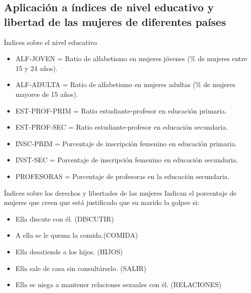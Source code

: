 \documentclass{beamer}
\begin{document}
\subsection{Aplicación a índices de nivel educativo y libertad de las mujeres de diferentes países}
\begin{frame}{Índices sobre el nivel educativo}
\begin{footnotesize}
\begin{itemize}
    \item ALF-JOVEN = Ratio de alfabetismo en mujeres jóvenes (\% de mujeres entre 15 y 24 años).
    \item ALF-ADULTA = Ratio de alfabetismo en mujeres adultas (\% de mujeres mayores de 15 años).
    \item EST-PROF-PRIM = Ratio estudiante-profesor en educación primaria.
    \item EST-PROF-SEC = Ratio estudiante-profesor en educación secundaria.
    \item INSC-PRIM = Porcentaje de inscripción femenino en educación primaria.
    \item INST-SEC = Porcentaje de inscripción femenino en educación secundaria.
    \item PROFESORAS = Porcentaje de profesoras en la educación secundaria.
\end{itemize}
\end{footnotesize}
\end{frame}

\begin{frame}{Índices sobre los derechos y libertades de las mujeres}
Indican el porcentaje de mujeres que creen que está justificado que su marido la golpee si:
\begin{itemize}
    \item Ella discute con él. (DISCUTIR)
    \item A ella se le quema la comida.(COMIDA)
    \item Ella desatiende a los hijos. (HIJOS)
    \item Ella sale de casa sin consultárselo. (SALIR)
    \item Ella se niega a mantener relaciones sexuales con él. (RELACIONES)
\end{itemize}
\end{frame}
\end{document}
